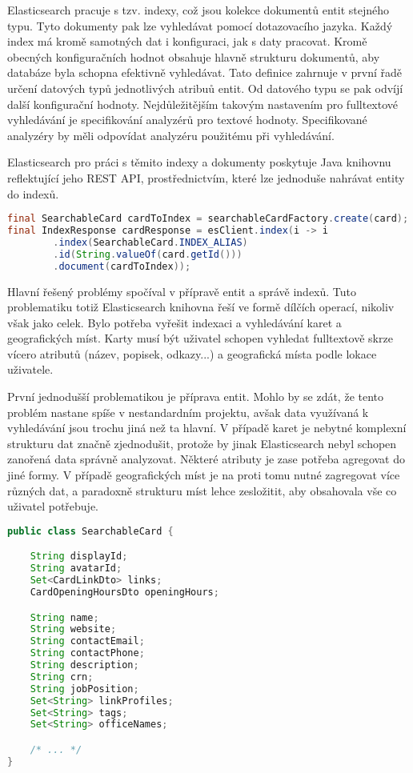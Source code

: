 		Elasticsearch pracuje s tzv. indexy, což jsou kolekce dokumentů entit stejného typu.
		Tyto dokumenty pak lze vyhledávat pomocí dotazovacího jazyka.
		Každý index má kromě samotných dat i konfiguraci, jak s daty pracovat.
		Kromě obecných konfiguračních hodnot obsahuje hlavně strukturu dokumentů, aby databáze byla schopna efektivně vyhledávat.
		Tato definice zahrnuje v první řadě určení datových typů jednotlivých atribuů entit.
		Od datového typu se pak odvíjí další konfigurační hodnoty.
		Nejdůležitějším takovým nastavením pro fulltextové vyhledávání je specifikování analyzérů pro textové hodnoty.
		Specifikované analyzéry by měli odpovídat analyzéru použitému při vyhledávání.

		Elasticsearch pro práci s těmito indexy a dokumenty poskytuje Java knihovnu reflektující jeho \ac{REST} \ac{API},
		prostřednictvím, které lze jednoduše nahrávat entity do indexů.

		\begin{lstlisting}[language=Java, caption={Ukázka indexace jedné karty do Elasticsearch databáze. Zdroj: [autor]}]
final SearchableCard cardToIndex = searchableCardFactory.create(card);
final IndexResponse cardResponse = esClient.index(i -> i
		.index(SearchableCard.INDEX_ALIAS)
		.id(String.valueOf(card.getId()))
		.document(cardToIndex));
		\end{lstlisting}

		Hlavní řešený problémy spočíval v přípravě entit a správě indexů.
		Tuto problematiku totiž Elasticsearch knihovna řeší ve formě dílčích operací, nikoliv však jako celek.
		Bylo potřeba vyřešit indexaci a vyhledávání karet a geografických míst.
		Karty musí být uživatel schopen vyhledat fulltextově skrze vícero atributů (název, popisek, odkazy...) a geografická
		místa podle lokace uživatele.

		První jednodušší problematikou je příprava entit.
		Mohlo by se zdát, že tento problém nastane spíše v nestandardním projektu, avšak data využívaná k vyhledávání
		jsou trochu jiná než ta hlavní.
		V případě karet je nebytné komplexní strukturu dat značně zjednodušit, protože by jinak Elasticsearch
		nebyl schopen zanořená data správně analyzovat.
		Některé atributy je zase potřeba agregovat do jiné formy.
		V případě geografických míst je na proti tomu nutné zagregovat více různých dat, a paradoxně strukturu míst lehce
		zesložitit, aby obsahovala vše co uživatel potřebuje.

		\begin{lstlisting}[language=Java, caption={Ukázka indexovatelné varianty karty. Obsahuje metadata a vyhledatelné data. Zdroj: [autor]}]
public class SearchableCard {

    String displayId;
    String avatarId;
    Set<CardLinkDto> links;
    CardOpeningHoursDto openingHours;

    String name;
    String website;
    String contactEmail;
    String contactPhone;
    String description;
    String crn;
    String jobPosition;
    Set<String> linkProfiles;
    Set<String> tags;
    Set<String> officeNames;

    /* ... */
}
		\end{lstlisting}

